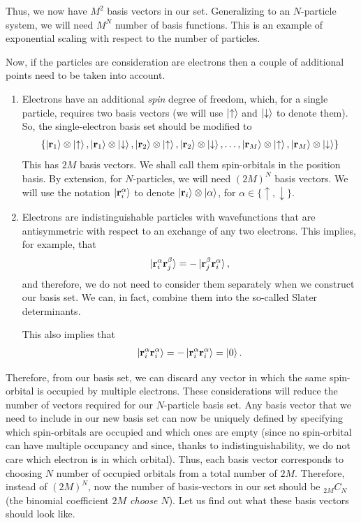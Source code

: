 \documentclass[12pt,oneside]{book}
\begin{document}
Thus, we now have $M^2$ basis vectors in our set. Generalizing to an $N$-particle system, we will need $M^N$ number of basis functions. This is an example of exponential scaling with respect to the number of particles.

Now, if the particles are consideration are electrons then a couple of additional points need to be taken into account.
\begin{enumerate}
    \item Electrons have an additional \textit{spin} degree of freedom, which, for a single particle, requires two basis vectors (we will use $\ket{\uparrow}$ and $\ket{\downarrow}$ to denote them). So, the single-electron basis set should be modified to 
    \begin{align*}
        \{\ket{\mathbf{r}_1}\otimes\ket{\uparrow}, \ket{\mathbf{r}_1}\otimes\ket{\downarrow}, \ket{\mathbf{r}_2}\otimes\ket{\uparrow}, \ket{\mathbf{r}_2}\otimes\ket{\downarrow},\hdots, \ket{\mathbf{r}_M}\otimes\ket{\uparrow}, \ket{\mathbf{r}_M}\otimes\ket{\downarrow}\}
    \end{align*}
    This has $2M$ basis vectors.  We shall call them spin-orbitals in the position basis. By extension, for $N$-particles, we will need $(2M)^N$ basis vectors. We will use the notation $\ket{\mathbf{r}_i^\alpha}$ to denote $\ket{\mathbf{r}_i}\otimes\ket{\alpha}$, for $\alpha \in \{\uparrow,\downarrow\}$.
    \item Electrons are indistinguishable particles with wavefunctions that are antisymmetric with respect to an exchange of any two electrons. This implies, for example, that
    \begin{align}
        \ket{\mathbf{r}_i^\alpha\mathbf{r}_j^\beta} = -\ket{\mathbf{r}_j^\beta\mathbf{r}_i^\alpha},
    \end{align}
    and therefore, we do not need to consider them separately when we construct our basis set. We can, in fact, combine them into the so-called Slater determinants.

    This also implies that
\begin{align}
\ket{\mathbf{r}_i^\alpha\mathbf{r}_i^\alpha}=-\ket{\mathbf{r}_i^\alpha\mathbf{r}_i^\alpha}=\ket{0}.
\end{align}

\end{enumerate}

Therefore, from our basis set, we can discard any vector in which the same spin-orbital is occupied by multiple electrons. These considerations will reduce the number of vectors required for our $N$-particle basis set. Any basis vector that we need to include in our new basis set can now be uniquely defined by specifying which spin-orbitals are occupied and which ones are empty (since no spin-orbital can have multiple occupancy and since, thanks to indistinguishability, we do not care which electron is in which orbital). Thus, each basis vector corresponds to choosing $N$ number of occupied orbitals from a total number of $2M$. Therefore, instead of $(2M)^N$, now the number of basis-vectors in our set should be $_{2M}C_N$ (the binomial coefficient \textit{$2M$ choose $N$}). Let us find out what these basis vectors should look like.
\end{document}

